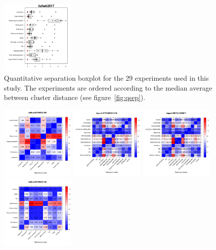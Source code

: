 \documentclass[12pt]{article}\usepackage[]{graphicx}\usepackage[]{color}
\begin{document}
\begin{appendices}
\begin{figure}[htb]
  \includegraphics[width = 0.32\textwidth]{./figure/allqseps-28.pdf}
  \caption{Quantitative separation boxplot for the 29
    experiments used in this study. The experiments are ordered
    according to the median average between cluster distance (see
    figure~\ref{fig:qsep}). }
  \label{fig:allqseps}
\end{figure}

\begin{figure}[htb]
  \centering
  \includegraphics[width = 0.32\textwidth]{./figure/allhmaps-1.pdf}
  \includegraphics[width = 0.32\textwidth]{./figure/allhmaps-2.pdf}
  \includegraphics[width = 0.32\textwidth]{./figure/allhmaps-3.pdf}
  \includegraphics[width = 0.32\textwidth]{./figure/allhmaps-4.pdf}

\end{figure}
\end{appendices}
\end{document}
